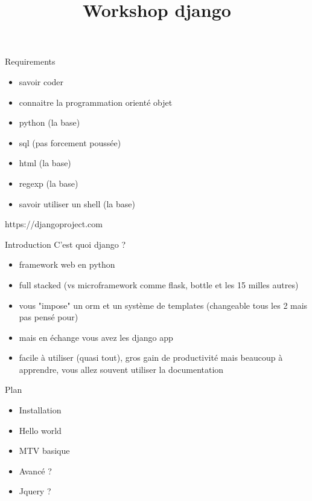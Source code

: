 \documentclass{beamer}
\begin{document}
\title{Workshop django}

\maketitle{}

\begin{frame}{Requirements}
\begin{itemize}
    \item savoir coder
    \item connaitre la programmation orienté objet
    \item python (la base)
    \item sql (pas forcement poussée)
    \item html (la base)
    \item regexp (la base)
    \item savoir utiliser un shell (la base)
\end{itemize}
\end{frame}

\begin{frame}[fragile]{}
    \LARGE \begin{center}https://djangoproject.com\end{center}
\end{frame}

\begin{frame}{Introduction}
    \vspace{3mm}
    C'est quoi django ?
    \begin{itemize}
        \item framework web en python\pause
        \item full stacked (vs microframework comme flask, bottle et les 15 milles autres)\pause
        \item vous "impose" un orm et un système de templates (changeable tous les 2 mais pas pensé pour)\pause
        \item mais en échange vous avez les django app\pause
        \item facile à utiliser (quasi tout), gros gain de productivité mais beaucoup à apprendre, vous allez souvent utiliser la documentation
    \end{itemize}
\end{frame}

\begin{frame}{Plan}
    \begin{itemize}
        \item Installation
        \item Hello world
        \item MTV basique
        \item Avancé ?
        \item Jquery ?
    \end{itemize}
\end{frame}
\end{document}
